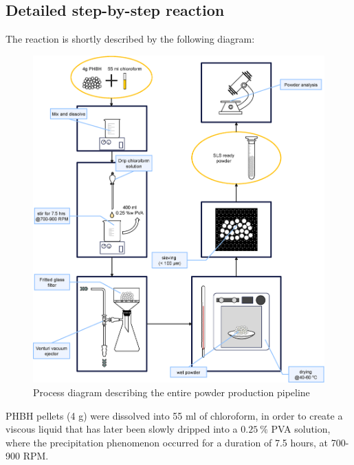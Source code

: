 \documentclass{article}
\begin{document}
        \subsection{Detailed step-by-step reaction\label{detailed_reaction}}

        The reaction is shortly described by the following diagram: 

            \begin{figure}[ht]
                \centering
                \includegraphics[width=\textwidth]{Pictures/process_diagram.eps}
                \caption{Process diagram describing the entire powder production pipeline}
                \label{fig:process_diagram}
            \end{figure}

        \clearpage

        PHBH pellets (4 g) were dissolved into 55 ml of chloroform, in order to create a viscous liquid that has later been slowly dripped into a 
        $0.25 \ \%$ PVA solution, where the precipitation phenomenon occurred for a duration of 7.5 hours, at 700-900 RPM. \\ 

        
\end{document}
